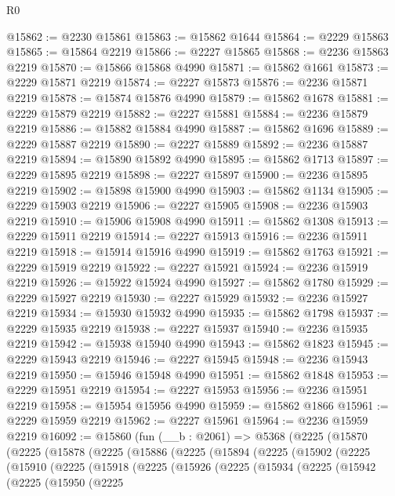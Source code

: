 \begin{lexlean}{R0}
\begin{coremodule}
@15862 := @2230 @15861
@15863 := @15862 @1644
@15864 := @2229 @15863
@15865 := @15864 @2219
@15866 := @2227 @15865
@15868 := @2236 @15863 @2219
@15870 := @15866 @15868 @4990
@15871 := @15862 @1661
@15873 := @2229 @15871 @2219
@15874 := @2227 @15873
@15876 := @2236 @15871 @2219
@15878 := @15874 @15876 @4990
@15879 := @15862 @1678
@15881 := @2229 @15879 @2219
@15882 := @2227 @15881
@15884 := @2236 @15879 @2219
@15886 := @15882 @15884 @4990
@15887 := @15862 @1696
@15889 := @2229 @15887 @2219
@15890 := @2227 @15889
@15892 := @2236 @15887 @2219
@15894 := @15890 @15892 @4990
@15895 := @15862 @1713
@15897 := @2229 @15895 @2219
@15898 := @2227 @15897
@15900 := @2236 @15895 @2219
@15902 := @15898 @15900 @4990
@15903 := @15862 @1134
@15905 := @2229 @15903 @2219
@15906 := @2227 @15905
@15908 := @2236 @15903 @2219
@15910 := @15906 @15908 @4990
@15911 := @15862 @1308
@15913 := @2229 @15911 @2219
@15914 := @2227 @15913
@15916 := @2236 @15911 @2219
@15918 := @15914 @15916 @4990
@15919 := @15862 @1763
@15921 := @2229 @15919 @2219
@15922 := @2227 @15921
@15924 := @2236 @15919 @2219
@15926 := @15922 @15924 @4990
@15927 := @15862 @1780
@15929 := @2229 @15927 @2219
@15930 := @2227 @15929
@15932 := @2236 @15927 @2219
@15934 := @15930 @15932 @4990
@15935 := @15862 @1798
@15937 := @2229 @15935 @2219
@15938 := @2227 @15937
@15940 := @2236 @15935 @2219
@15942 := @15938 @15940 @4990
@15943 := @15862 @1823
@15945 := @2229 @15943 @2219
@15946 := @2227 @15945
@15948 := @2236 @15943 @2219
@15950 := @15946 @15948 @4990
@15951 := @15862 @1848
@15953 := @2229 @15951 @2219
@15954 := @2227 @15953
@15956 := @2236 @15951 @2219
@15958 := @15954 @15956 @4990
@15959 := @15862 @1866
@15961 := @2229 @15959 @2219
@15962 := @2227 @15961
@15964 := @2236 @15959 @2219
@16092 := @15860
    (fun (__b : @2061) =>
    @5368
      (@2225
        (@15870
          (@2225
            (@15878
              (@2225
                (@15886
                  (@2225
                    (@15894
                      (@2225
                        (@15902
                          (@2225
                            (@15910
                              (@2225
                                (@15918
                                  (@2225
                                    (@15926
                                      (@2225
                                        (@15934
                                          (@2225
                                            (@15942
                                              (@2225
                                                (@15950
                                                  (@2225

\end{coremodule}
\end{lexlean}

